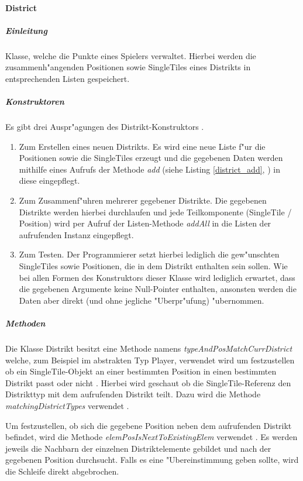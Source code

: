 \paragraph{District}
\label{par:district}
\subparagraph{Einleitung}
Klasse, welche die Punkte eines Spielers verwaltet. Hierbei werden die zusammenh"angenden Positionen sowie SingleTiles eines Distrikts in entsprechenden Listen gespeichert. 

\subparagraph{Konstruktoren} 
\label{spar:districtKonstruktoren}
Es gibt drei Auspr"agungen des Distrikt-Konstruktors . 
\begin{enumerate}
	\item Zum Erstellen eines neuen Distrikts. Es wird eine neue Liste f"ur die Positionen sowie die SingleTiles erzeugt und die gegebenen Daten werden mithilfe eines Aufrufs der Methode \emph{add} (siehe Listing \ref{district_add}, ) in diese eingepflegt. 
	\item Zum Zusammenf"uhren mehrerer gegebener Distrikte. Die gegebenen Distrikte werden hierbei durchlaufen und jede Teilkomponente (SingleTile / Position) wird per Aufruf der Listen-Methode \emph{addAll} in die Listen der aufrufenden Instanz eingepflegt. 
	\item Zum Testen. Der Programmierer setzt hierbei lediglich die gew"unschten SingleTiles sowie Positionen, die in dem Distrikt enthalten sein sollen. Wie bei allen Formen des Konstruktors dieser Klasse wird lediglich erwartet, dass die gegebenen Argumente keine Null-Pointer enthalten, ansonsten werden die Daten aber direkt (und ohne jegliche "Uberpr"ufung) "ubernommen.
\end{enumerate}

\subparagraph{Methoden}
\label{spar:districtMethoden}
Die Klasse Distrikt besitzt eine Methode namens \emph{typeAndPosMatchCurrDistrict} welche, zum Beispiel im abstrakten Typ Player, verwendet wird um festzustellen ob ein SingleTile-Objekt an einer bestimmten Position in einen bestimmten Distrikt passt oder nicht . Hierbei wird geschaut ob die SingleTile-Referenz den Distrikttyp mit dem aufrufenden Distrikt teilt. Dazu wird die Methode \emph{matchingDistrictTypes} verwendet .

Um festzustellen, ob sich die gegebene Position neben dem aufrufenden Distrikt befindet, wird die Methode \emph{elemPosIsNextToExistingElem} verwendet . Es werden jeweils die Nachbarn der einzelnen Distriktelemente gebildet und nach der gegebenen Position durchsucht. Falls es eine "Ubereinstimmung geben sollte, wird die Schleife direkt abgebrochen. 

